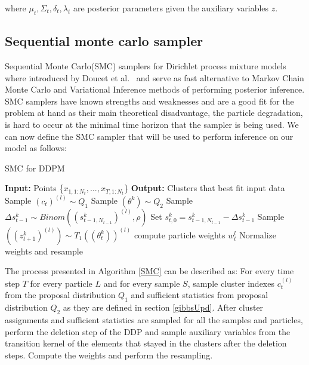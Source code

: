 \documentclass[twoside,hidelinks]{article}
\begin{document}
where $\mu_t, \Sigma_t, \delta_t,  \lambda_t$  are posterior parameters given the auxiliary variables $z$.

\subsection{Sequential monte carlo sampler}
\label{smcsampler}
Sequential Monte Carlo(SMC) samplers for Dirichlet process mixture models where introduced by Doucet et al.~\cite{doucet} and serve as fast alternative to Markov Chain Monte Carlo and Variational Inference methods of performing posterior inference. SMC samplers have known strengths and weaknesses and are a good fit for the problem at hand as their main theoretical disadvantage, the particle degradation, is hard to occur at the minimal time horizon that the sampler is being used. We can now define the SMC sampler that will be used to perform inference on our model as follows:

\begin{algorithm}[ht!]
  \caption{SMC for DDPM}\label{SMC}
  \begin{algorithmic}[1]
	\State \textbf{Input:} Points \{$x_{1,1:N_t}, ..., x_{T,1:N_t}$\}
	\State \textbf{Output:} Clusters that best fit input data
								\State Sample $(c_t)^{(l)} \sim Q_1$  
								\State Sample $(\theta^k ) \sim Q_2$
						    \EndFor		
			   \State Sample $\Delta s_{t-1}^k \sim Binom( (s_{t-1,N_{t-1}}^k)^{(l)}, \rho) $ 
		       \State Set $s_{t,0}^{k} = s_{t-1,N_{t-1}}^{k} -\Delta s_{t-1}^k$
   		       \State Sample $( (z_{t+1}^k)^{(l)} ) \sim T_1((\theta_t^k))^{(l)} $
		    \EndFor
		 	\State compute particle weights $w_t^l$
		    \EndFor
    \State Normalize weights and resample
    \EndFor
  \end{algorithmic}
\end{algorithm}

The process presented in Algorithm \ref{SMC} can be described as:
For every time step $T$ for every particle $L$ and for every sample $S$, sample cluster indexes $c_t^{(l)}$ from the proposal distribution $Q_1$ and sufficient statistics from proposal distribution $Q_2$ as they are defined in section \ref{gibbsUpd}. After cluster assignments and sufficient statistics are sampled for all the samples and particles, perform the deletion step of the DDP and sample auxiliary variables from the transition kernel of the elements that stayed in the clusters after the deletion steps. Compute the weights and perform the resampling. 
\end{document}
